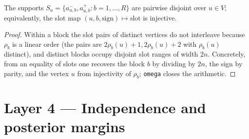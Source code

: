 \begin{lemma}
\label{lem:support_disjoint}
\leanok
{}
The supports $S_u = \{a^-_{u,b}, a^+_{u,b} : b = 1,\dots,R\}$ are pairwise disjoint
over $u \in V$; equivalently, the slot map
$(u,b,\mathrm{sign}) \mapsto \text{slot}$ is injective.
\end{lemma}
\begin{proof}
\leanok
Within a block the slot pairs of distinct vertices do not interleave because
$\rho_b$ is a linear order (the pairs are $2\rho_b(u){+}1, 2\rho_b(u){+}2$ with
$\rho_b(u)$ distinct), and distinct blocks occupy disjoint slot ranges of width
$2n$. Concretely, from an equality of slots one recovers the block $b$ by
dividing by $2n$, the sign by parity, and the vertex $u$ from injectivity of
$\rho_b$; \texttt{omega} closes the arithmetic.
\end{proof}

\section{Layer 4 --- Independence and posterior margins}

